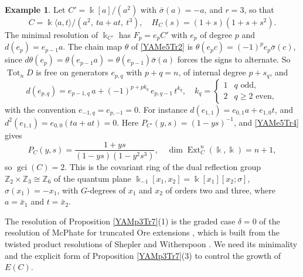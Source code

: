 \documentclass[reqno]{amsart}
\numberwithin{equation}{section}
\theoremstyle{definition}
\newtheorem{example}[equation]{Example}
\theoremstyle{remark}
\theoremstyle{plain}
\newcommand{\kk}{\Bbbk}
\DeclareMathOperator{\Ext}{Ext}
\DeclareMathOperator{\gci}{gci}
\DeclareMathOperator{\Tot}{Tot}
\begin{document}
\begin{example}\label{YAMex5Tr6}
Let $C'=\kk[a]/(a^2)$ with $\bar\sigma(a)=-a$, and $r=3$, so that
\[
C=\kk\langle a,t\rangle/(a^2,\ ta+at,\ t^3),\quad H_C(s)=(1+s)(1+s+s^2).
\]
The minimal resolution of $\kk_{C'}$ has $F_p=e_pC'$ with $e_p$ of degree $p$ and $d(e_p)=e_{p-1}a$. The chain map $\theta$ of \eqref{YAMe5Tr2} is $\theta(e_pc)=(-1)^pe_p\bar\sigma(c)$, since $d\theta(e_p)=\theta(e_{p-1}a)=\theta(e_{p-1})\bar\sigma(a)$ forces the signs to alternate. So $\Tot_nD$ is free on generators $e_{p,q}$ with $p+q=n$, of internal degree $p+s_q$, and
\[
d(e_{p,q})=e_{p-1,q}\,a+(-1)^{p+pk_q}\,e_{p,q-1}\,t^{k_q},\quad k_q=\begin{cases}1&q\text{ odd},\\2&q\ge2\text{ even},\end{cases}
\]
with the convention $e_{-1,q}=e_{p,-1}=0$. For instance $d(e_{1,1})=e_{0,1}a+e_{1,0}t$, and $d^2(e_{1,1})=e_{0,0}(ta+at)=0$. Here $P_{C'}(y,s)=(1-ys)^{-1}$, and \eqref{YAMe5Tr4} gives
\[
P_C(y,s)=\frac{1+ys}{(1-ys)(1-y^2s^3)},\quad\dim\Ext^n_C(\kk,\kk)=n+1,
\]
so $\gci(C)=2$. This is the covariant ring of the dual reflection group $\mathbb Z_2\times\mathbb Z_3\cong\mathbb Z_6$ of the quantum plane $\kk_{-1}[x_1,x_2]=\kk[x_1][x_2;\sigma]$, $\sigma(x_1)=-x_1$, with $G$-degrees of $x_1$ and $x_2$ of orders two and three, where $a=\bar x_1$ and $t=\bar x_2$.
\end{example}

The resolution of Proposition \ref{YAMp3Tr7}(1) is the graded case $\delta=0$ of the resolution of McPhate for truncated Ore extensions \cite[Theorem 3.10]{McP}, which is built from the twisted product resolutions of Shepler and Witherspoon \cite[Theorem 5.12]{SW}. We need its minimality and the explicit form of Proposition \ref{YAMp3Tr7}(3) to control the growth of $E(C)$.
\end{document}
